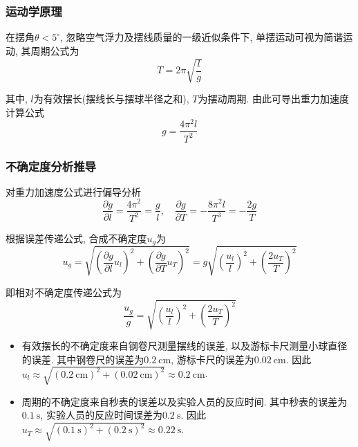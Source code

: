 \documentclass[9pt,a4paper,twoside]{../rho-class/rho}
\begin{document}
\subsubsection{运动学原理}

在摆角$\theta < 5^\circ$, 忽略空气浮力及摆线质量的一级近似条件下, 单摆运动可视为简谐运动, 其周期公式为
\begin{equation}
    T = 2\pi\sqrt{\frac{l}{g}}
\end{equation}

其中, $l$为有效摆长(摆线长与摆球半径之和), $T$为摆动周期.
由此可导出重力加速度计算公式
\begin{equation}
    g = \frac{4\pi^2 l}{T^2}
\end{equation}

\subsubsection{不确定度分析推导}

对重力加速度公式进行偏导分析
\begin{equation}
    \frac{\partial g}{\partial l} = \frac{4\pi^2}{T^2} = \frac{g}{l}, \quad \frac{\partial g}{\partial T} = -\frac{8\pi^2 l}{T^3} = -\frac{2g}{T}
\end{equation}

根据误差传递公式, 合成不确定度$u_g$为
\begin{equation}
    u_g = \sqrt{\left( \frac{\partial g}{\partial l} u_l \right)^2 + \left( \frac{\partial g}{\partial T} u_T \right)^2} = g \sqrt{\left( \frac{u_l}{l} \right)^2 + \left( \frac{2u_T}{T} \right)^2}
\end{equation}

即相对不确定度传递公式为
\begin{equation}
    \frac{u_g}{g} = \sqrt{\left( \frac{u_l}{l} \right)^2 + \left( \frac{2u_T}{T} \right)^2}
\end{equation}

\begin{rhoenv}[frametitle=Attention.]
    \begin{itemize}
        \item 有效摆长的不确定度来自钢卷尺测量摆线的误差, 以及游标卡尺测量小球直径的误差.
              其中钢卷尺的误差为$\qty{0.2}{\centi\metre}$, 游标卡尺的误差为$\qty{0.02}{\centi\metre}$.
              因此$u_l \approx \sqrt{(\qty{0.2}{\centi\metre})^2 + (\qty{0.02}{\centi\metre})^2} \approx \qty{0.2}{\centi\metre}$.

        \item 周期的不确定度来自秒表的误差以及实验人员的反应时间.
              其中秒表的误差为$\qty{0.1}{\second}$, 实验人员的反应时间误差为$\qty{0.2}{\second}$.
              因此$u_T \approx \sqrt{(\qty{0.1}{\second})^2 + (\qty{0.2}{\second})^2} \approx \qty{0.22}{\second}$.
    \end{itemize}
\end{rhoenv}
\end{document}
